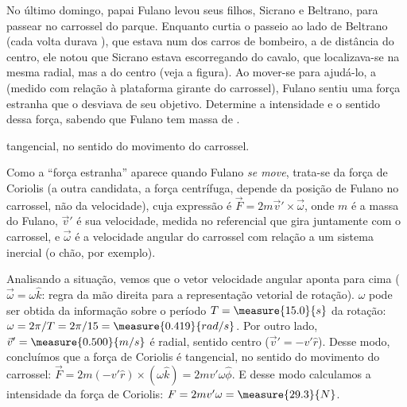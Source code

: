 \begin{question}
	No último domingo, papai Fulano levou seus filhos, Sicrano e Beltrano, para passear no carrossel do parque.
	Enquanto curtia o passeio ao lado de Beltrano (cada volta durava ), que estava num dos carros de bombeiro, a  de distância do centro, ele notou que Sicrano estava escorregando do cavalo, que localizava-se na mesma radial, mas a  do centro (veja a figura).
	Ao mover-se para ajudá-lo, a  (medido com relação à plataforma girante do carrossel), Fulano sentiu uma força estranha que o desviava de seu objetivo.
	Determine a intensidade e o sentido dessa força, sabendo que Fulano tem massa de .

	\begin{answer}
		 tangencial, no sentido do movimento do carrossel.
	\end{answer}


	\begin{solution}
		Como a ``força estranha'' aparece quando Fulano \emph{se move}, trata-se da força de Coriolis (a outra candidata, a força centrífuga, depende da posição de Fulano no carrossel, não da velocidade), cuja expressão é $\vec F = 2m\vec v' \times \vec \omega$, onde $m$ é a massa do Fulano, $\vec v'$ é sua velocidade, medida no referencial que gira juntamente com o carrossel, e $\vec\omega$ é a velocidade angular do carrossel com relação a um sistema inercial (o chão, por exemplo).

		Analisando a situação, vemos que o vetor velocidade angular aponta para cima ($\vec\omega = \omega\hat k$: regra da mão direita para a representação vetorial de rotação). $\omega$ pode ser obtida da informação sobre o período $T = \measure{15.0}{s}$ da rotação: $\omega = 2\pi/T = 2\pi/15 = \measure{0.419}{rad/s}$. Por outro lado, $\vec v' = \measure{0.500}{m/s}$ é radial, sentido centro ($\vec v' = -v'\hat r$).
		Desse modo, concluímos que a força de Coriolis é tangencial, no sentido do movimento do carrossel: $\vec F = 2m(-v'\hat r)\times(\omega \hat k) = 2mv'\omega \hat \phi$. E desse modo calculamos a intensidade da força de Coriolis: $F = 2mv'\omega = \measure{29.3}{N}$.
	\end{solution}
\end{question}